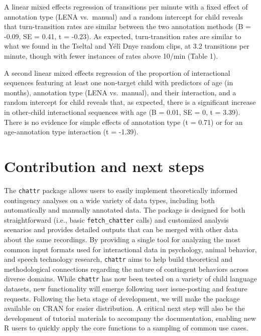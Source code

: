 \documentclass[10pt, letterpaper]{article}
\begin{document}
A linear mixed effects regression of transitions per minute with a fixed
effect of annotation type (LENA vs.~manual) and a random intercept for
child reveals that turn-transition rates are similar between the two
annotation methods (B = -0.09, SE = 0.41, t = -0.23). As expected,
turn-transition rates are similar to what we found in the Tseltal and
Yélî Dnye random clips, at 3.2 transitions per minute, though with fewer
instances of rates above 10/min (Table 1).

A second linear mixed effects regression of the proportion of
interactional sequences featuring at least one non-target child with
predictors of age (in months), annotation type (LENA vs.~manual), and
their interaction, and a random intercept for child reveals that, as
expected, there is a significant increase in other-child interactional
sequences with age (B = 0.01, SE = 0, t = 3.39). There is no evidence
for simple effects of annotation type (t = 0.71) or for an
age-annotation type interaction (t = -1.39).

\hypertarget{contribution-and-next-steps}{%
\section{Contribution and next
steps}\label{contribution-and-next-steps}}

The \texttt{chattr} package allows users to easily implement
theoretically informed contingency analyses on a wide variety of data
types, including both automatically and manually annotated data. The
package is designed for both straightforward (i.e., basic
\texttt{fetch\_chatter} calls) and customized analysis scenarios and
provides detailed outputs that can be merged with other data about the
same recordings. By providing a single tool for analyzing the most
common input formats used for interactional data in psychology, animal
behavior, and speech technology research, \texttt{chattr} aims to help
build theoretical and methodological connections regarding the nature of
contingent behaviors across diverse domains. While \texttt{chattr} has
now been tested on a variety of child language datasets, new
functionality will emerge following user issue-posting and feature
requests. Following the beta stage of development, we will make the
package available on CRAN for easier distribution. A critical next step
will also be the development of tutorial materials to accompany the
documentation, enabling new R users to quickly apply the core functions
to a sampling of common use cases.
\end{document}
